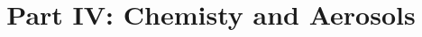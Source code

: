 \documentclass[12pt]{book}
\begin{document}
\title{Part IV: Chemisty and Aerosols}
\dominitoc
\tableofcontents




\end{document}
